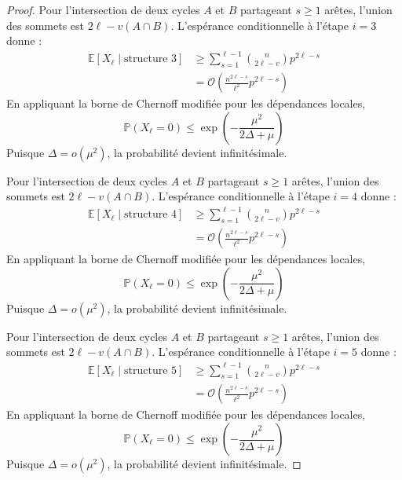 \documentclass[11pt,a4paper]{article}
\theoremstyle{definition}
\begin{document}
\begin{proof}
Pour l'intersection de deux cycles $A$ et $B$ partageant $s \ge 1$ arêtes, l'union des sommets est $2\ell - v(A \cap B)$.
L'espérance conditionnelle à l'étape $i=3$ donne :
\begin{align*}
\mathbb{E}[X_\ell \mid \text{structure } 3] &\ge \sum_{s=1}^{\ell-1} \binom{n}{2\ell - v} p^{2\ell - s} \\
&= \mathcal{O}\left( \frac{n^{2\ell - s}}{\ell^2} p^{2\ell - s} \right)
\end{align*}
En appliquant la borne de Chernoff modifiée pour les dépendances locales,
\begin{equation}
\mathbb{P}(X_\ell = 0) \le \exp\left(-\frac{\mu^2}{2\Delta + \mu}\right)
\end{equation}
Puisque $\Delta = o(\mu^2)$, la probabilité devient infinitésimale.

Pour l'intersection de deux cycles $A$ et $B$ partageant $s \ge 1$ arêtes, l'union des sommets est $2\ell - v(A \cap B)$.
L'espérance conditionnelle à l'étape $i=4$ donne :
\begin{align*}
\mathbb{E}[X_\ell \mid \text{structure } 4] &\ge \sum_{s=1}^{\ell-1} \binom{n}{2\ell - v} p^{2\ell - s} \\
&= \mathcal{O}\left( \frac{n^{2\ell - s}}{\ell^2} p^{2\ell - s} \right)
\end{align*}
En appliquant la borne de Chernoff modifiée pour les dépendances locales,
\begin{equation}
\mathbb{P}(X_\ell = 0) \le \exp\left(-\frac{\mu^2}{2\Delta + \mu}\right)
\end{equation}
Puisque $\Delta = o(\mu^2)$, la probabilité devient infinitésimale.

Pour l'intersection de deux cycles $A$ et $B$ partageant $s \ge 1$ arêtes, l'union des sommets est $2\ell - v(A \cap B)$.
L'espérance conditionnelle à l'étape $i=5$ donne :
\begin{align*}
\mathbb{E}[X_\ell \mid \text{structure } 5] &\ge \sum_{s=1}^{\ell-1} \binom{n}{2\ell - v} p^{2\ell - s} \\
&= \mathcal{O}\left( \frac{n^{2\ell - s}}{\ell^2} p^{2\ell - s} \right)
\end{align*}
En appliquant la borne de Chernoff modifiée pour les dépendances locales,
\begin{equation}
\mathbb{P}(X_\ell = 0) \le \exp\left(-\frac{\mu^2}{2\Delta + \mu}\right)
\end{equation}
Puisque $\Delta = o(\mu^2)$, la probabilité devient infinitésimale.


\end{proof}
\end{document}
